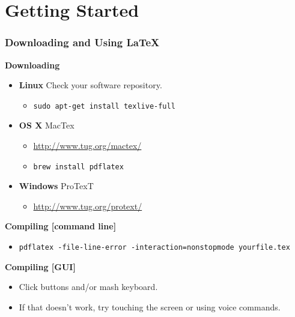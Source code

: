 \documentclass[notes=only]{beamer}
\begin{document}
\section{Getting Started}
\begin{frame} \frametitle{Downloading and Using \LaTeX}
    \textbf{Downloading}
    \begin{itemize}
        \item \textbf{Linux} Check your software repository.
        \begin{itemize} \item \texttt{sudo apt-get install texlive-full} \end{itemize}  
        \item \textbf{OS X} MacTex
        \begin{itemize} \item \url{http://www.tug.org/mactex/}
        \item \texttt{brew install pdflatex} \end{itemize}
        \item \textbf{Windows} ProTexT
        \begin{itemize} \item \url{http://www.tug.org/protext/} \end{itemize}
    \end{itemize}
        
    \textbf{Compiling [command line]}
    \begin{itemize}
        \item {\scriptsize \texttt{pdflatex -file-line-error -interaction=nonstopmode yourfile.tex}}
    \end{itemize}

    \textbf{Compiling [GUI]}
    \begin{itemize}
            \item Click buttons and/or mash keyboard.  
            \item If that doesn't work, try touching the screen or using voice commands.
    \end{itemize}
\end{frame}
\end{document}
